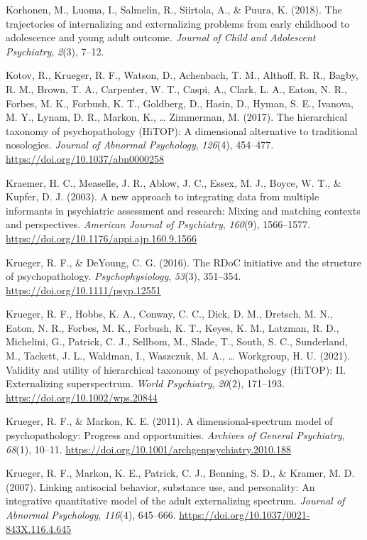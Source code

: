 \documentclass[
  american,
  letterpaper,
  12pt]{article}
\newlength{\cslhangindent}
\newenvironment{CSLReferences}[2] %
 {\begin{list}{}{%
  \setlength{\itemindent}{0pt}
  \setlength{\leftmargin}{0pt}
  \setlength{\parsep}{0pt}
  \ifodd #1
   \setlength{\leftmargin}{\cslhangindent}
   \setlength{\itemindent}{-1\cslhangindent}
  \fi
  \setlength{\itemsep}{#2\baselineskip}}}
 {\end{list}}
\begin{document}
\begin{CSLReferences}{1}{0}
Korhonen, M., Luoma, I., Salmelin, R., Siirtola, A., \& Puura, K.
(2018). The trajectories of internalizing and externalizing problems
from early childhood to adolescence and young adult outcome.
\emph{Journal of Child and Adolescent Psychiatry}, \emph{2}(3), 7--12.

Kotov, R., Krueger, R. F., Watson, D., Achenbach, T. M., Althoff, R. R.,
Bagby, R. M., Brown, T. A., Carpenter, W. T., Caspi, A., Clark, L. A.,
Eaton, N. R., Forbes, M. K., Forbush, K. T., Goldberg, D., Hasin, D.,
Hyman, S. E., Ivanova, M. Y., Lynam, D. R., Markon, K., \ldots{}
Zimmerman, M. (2017). The hierarchical taxonomy of psychopathology
({HiTOP}): {A} dimensional alternative to traditional nosologies.
\emph{Journal of Abnormal Psychology}, \emph{126}(4), 454--477.
\url{https://doi.org/10.1037/abn0000258}

Kraemer, H. C., Measelle, J. R., Ablow, J. C., Essex, M. J., Boyce, W.
T., \& Kupfer, D. J. (2003). A new approach to integrating data from
multiple informants in psychiatric assessment and research: {Mixing} and
matching contexts and perspectives. \emph{American Journal of
Psychiatry}, \emph{160}(9), 1566--1577.
\url{https://doi.org/10.1176/appi.ajp.160.9.1566}

Krueger, R. F., \& DeYoung, C. G. (2016). The {RDoC} initiative and the
structure of psychopathology. \emph{Psychophysiology}, \emph{53}(3),
351--354. \url{https://doi.org/10.1111/psyp.12551}

Krueger, R. F., Hobbs, K. A., Conway, C. C., Dick, D. M., Dretsch, M.
N., Eaton, N. R., Forbes, M. K., Forbush, K. T., Keyes, K. M., Latzman,
R. D., Michelini, G., Patrick, C. J., Sellbom, M., Slade, T., South, S.
C., Sunderland, M., Tackett, J. L., Waldman, I., Waszczuk, M. A.,
\ldots{} Workgroup, H. U. (2021). Validity and utility of hierarchical
taxonomy of psychopathology ({HiTOP}): {II}. {Externalizing}
superspectrum. \emph{World Psychiatry}, \emph{20}(2), 171--193.
\url{https://doi.org/10.1002/wps.20844}

Krueger, R. F., \& Markon, K. E. (2011). A dimensional-spectrum model of
psychopathology: {Progress} and opportunities. \emph{Archives of General
Psychiatry}, \emph{68}(1), 10--11.
\url{https://doi.org/10.1001/archgenpsychiatry.2010.188}

Krueger, R. F., Markon, K. E., Patrick, C. J., Benning, S. D., \&
Kramer, M. D. (2007). Linking antisocial behavior, substance use, and
personality: {An} integrative quantitative model of the adult
externalizing spectrum. \emph{Journal of Abnormal Psychology},
\emph{116}(4), 645--666.
\url{https://doi.org/10.1037/0021-843X.116.4.645}


\end{CSLReferences}
\end{document}
